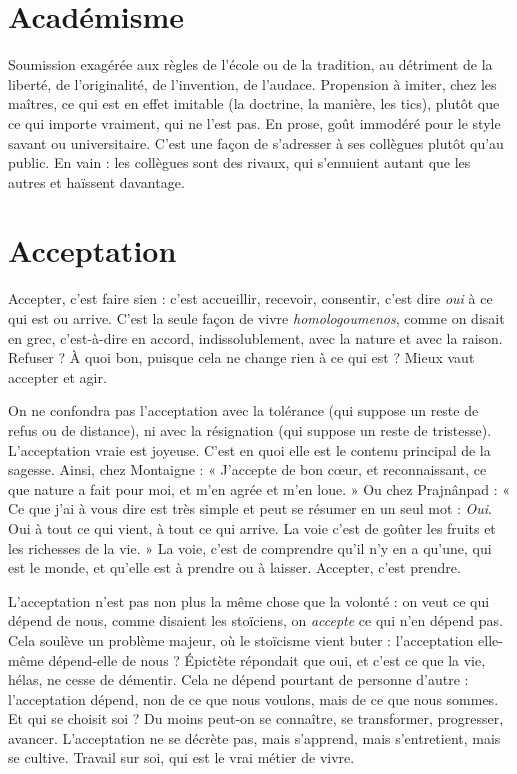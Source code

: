 \section{Académisme}
Soumission exagérée aux règles de l’école ou de la tradition,
au détriment de la liberté, de l’originalité, de l’invention,
de l’audace. Propension à imiter, chez les maîtres, ce qui est en effet imitable
(la doctrine, la manière, les tics), plutôt que ce qui importe vraiment, qui
ne l’est pas. En prose, goût immodéré pour le style savant ou universitaire.
C’est une façon de s'adresser à ses collègues plutôt qu’au public. En vain : les
collègues sont des rivaux, qui s’ennuient autant que les autres et haïssent davantage.

\section{Acceptation}
Accepter, c’est faire sien : c’est accueillir, recevoir, consentir,
c’est dire {\it oui} à ce qui est ou arrive. C’est la seule façon
de vivre {\it homologoumenos}, comme on disait en grec, c’est-à-dire en accord,
indissolublement, avec la nature et avec la raison. Refuser ? À quoi bon,
puisque cela ne change rien à ce qui est ? Mieux vaut accepter et agir.

On ne confondra pas l’acceptation avec la tolérance (qui suppose un reste
de refus ou de distance), ni avec la résignation (qui suppose un reste de tristesse).
L’acceptation vraie est joyeuse. C’est en quoi elle est le contenu principal
de la sagesse. Ainsi, chez Montaigne : « J’accepte de bon cœur, et reconnaissant,
ce que nature a fait pour moi, et m'en agrée et m’en loue. » Ou chez
Prajnânpad : « Ce que j'ai à vous dire est très simple et peut se résumer en un
seul mot : {\it Oui}. Oui à tout ce qui vient, à tout ce qui arrive. La voie c’est de
goûter les fruits et les richesses de la vie. » La voie, c’est de comprendre qu’il
n'y en a qu’une, qui est le monde, et qu’elle est à prendre ou à laisser. Accepter,
c’est prendre.

L’acceptation n’est pas non plus la même chose que la volonté : on veut ce
qui dépend de nous, comme disaient les stoïciens, on {\it accepte} ce qui n’en
dépend pas. Cela soulève un problème majeur, où le stoïcisme vient buter :
l'acceptation elle-même dépend-elle de nous ? Épictète répondait que oui, et
c'est ce que la vie, hélas, ne cesse de démentir. Cela ne dépend pourtant de personne
d’autre : l’acceptation dépend, non de ce que nous voulons, mais de ce
que nous sommes. Et qui se choisit soi ? Du moins peut-on se connaître, se
transformer, progresser, avancer. L’acceptation ne se décrète pas, mais
s’apprend, mais s’entretient, mais se cultive. Travail sur soi, qui est le vrai
métier de vivre.

